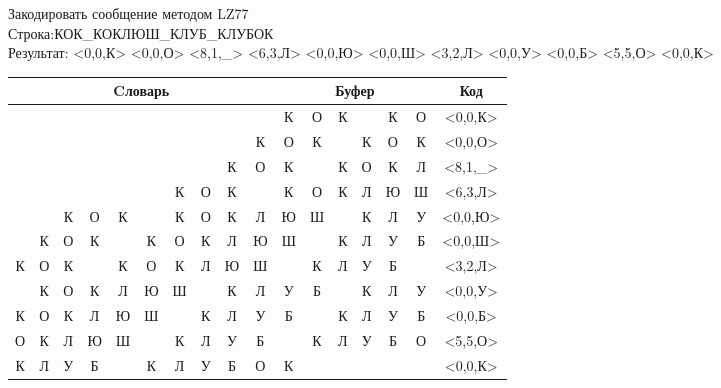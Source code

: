 \documentclass[a4paper, 12pt]{article}
\begin{document}
Закодировать сообщение методом LZ77\\
Строка:КОК\_КОКЛЮШ\_КЛУБ\_КЛУБОК\\
Результат: <0,0,К> <0,0,О> <8,1,\_> <6,3,Л> <0,0,Ю> <0,0,Ш> <3,2,Л> <0,0,У> <0,0,Б> <5,5,О> <0,0,К>\\
\begin{table}[h!]
\centering
\begin{tabular}{|c|c|c|c|c|c|c|c|c|c|c|c|c|c|c|c|c|} 
\hline
\multicolumn{10}{|c|}{Cловарь} & \multicolumn{6}{c|}{Буфер} & Код  \\ \hline
  &   &   &   &   &   &   &   &   &   & \cellcolor[HTML]{8CE4F6} К & О & К &   & К & О & <0,0,К>
\\ \hline
  &   &   &   &   &   &   &   &   & К & \cellcolor[HTML]{8CE4F6} О & К &   & К & О & К & <0,0,О>
\\ \hline
  &   &   &   &   &   &   &   & \cellcolor[HTML]{FFFF00} К & О & \cellcolor[HTML]{FFFF00} К & \cellcolor[HTML]{8CE4F6}   & К & О & К & Л & <8,1,\_>
\\ \hline
  &   &   &   &   &   & \cellcolor[HTML]{FFFF00} К & \cellcolor[HTML]{FFFF00} О & \cellcolor[HTML]{FFFF00} К &   & \cellcolor[HTML]{FFFF00} К & \cellcolor[HTML]{FFFF00} О & \cellcolor[HTML]{FFFF00} К & \cellcolor[HTML]{8CE4F6} Л & Ю & Ш & <6,3,Л>
\\ \hline
  &   & К & О & К &   & К & О & К & Л & \cellcolor[HTML]{8CE4F6} Ю & Ш &   & К & Л & У & <0,0,Ю>
\\ \hline
  & К & О & К &   & К & О & К & Л & Ю & \cellcolor[HTML]{8CE4F6} Ш &   & К & Л & У & Б & <0,0,Ш>
\\ \hline
К & О & К & \cellcolor[HTML]{FFFF00}   & \cellcolor[HTML]{FFFF00} К & О & К & Л & Ю & Ш & \cellcolor[HTML]{FFFF00}   & \cellcolor[HTML]{FFFF00} К & \cellcolor[HTML]{8CE4F6} Л & У & Б &   & <3,2,Л>
\\ \hline
  & К & О & К & Л & Ю & Ш &   & К & Л & \cellcolor[HTML]{8CE4F6} У & Б &   & К & Л & У & <0,0,У>
\\ \hline
К & О & К & Л & Ю & Ш &   & К & Л & У & \cellcolor[HTML]{8CE4F6} Б &   & К & Л & У & Б & <0,0,Б>
\\ \hline
О & К & Л & Ю & Ш & \cellcolor[HTML]{FFFF00}   & \cellcolor[HTML]{FFFF00} К & \cellcolor[HTML]{FFFF00} Л & \cellcolor[HTML]{FFFF00} У & \cellcolor[HTML]{FFFF00} Б & \cellcolor[HTML]{FFFF00}   & \cellcolor[HTML]{FFFF00} К & \cellcolor[HTML]{FFFF00} Л & \cellcolor[HTML]{FFFF00} У & \cellcolor[HTML]{FFFF00} Б & \cellcolor[HTML]{8CE4F6} О & <5,5,О>
\\ \hline
К & Л & У & Б &   & К & Л & У & Б & О & \cellcolor[HTML]{8CE4F6} К &   &   &   &   &   & <0,0,К>
\\ \hline
\end{tabular}
\end{table}
\end{document}
